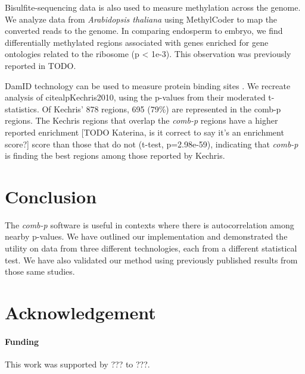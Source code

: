 \documentclass{bioinfo}
\begin{document}
\begin{methods}
Bisulfite-sequencing data is also used to measure methylation across the genome.
We analyze data from {\it Arabidopsis thaliana} using MethylCoder
\citep{Pedersen2011} to map the converted reads to the genome. In
comparing endosperm to
embryo, we find differentially methylated regions associated with genes
enriched for gene ontologies related to the ribosome (p < 1e-3).
This observation was previously reported in TODO.

DamID technology can be used to measure protein binding sites \citealp{Steensel2001}.
We recreate analysis of citealp{Kechris2010}, using the p-values from their moderated
t-statistics. Of Kechris' 878 regions, 695 (79\%) are represented in the comb-p regions.
The Kechris regions that overlap the \textit{comb-p} regions have a higher reported
enrichment [TODO Katerina, is it correct to say it's an enrichment score?] score than
those that do not (t-test, p=2.98e-59), indicating that \textit{comb-p} is finding the
best regions among those reported by Kechris.

\end{methods}

\section{Conclusion}
The \textit{comb-p} software is useful in contexts where there is
autocorrelation among nearby p-values. We have outlined our implementation
and demonstrated the utility on data from three different technologies,
each from a different statistical test. We have also validated our method
using previously published results from those same studies.

\section*{Acknowledgement}

\paragraph{Funding\textcolon} This work was supported by ??? to ???.

%
%
%
%
%
%
%
\end{document}
